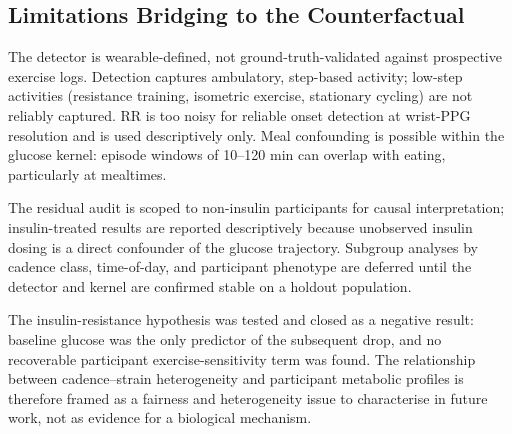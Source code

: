 \subsection{Limitations Bridging to the Counterfactual}
\label{subsec:ex_limitations}

The detector is wearable-defined, not ground-truth-validated against
prospective exercise logs.
Detection captures ambulatory, step-based activity; low-step activities
(resistance training, isometric exercise, stationary cycling) are not reliably
captured.
RR is too noisy for reliable onset detection at wrist-PPG resolution and is
used descriptively only.
Meal confounding is possible within the glucose kernel: episode windows
of 10--120 min can overlap with eating, particularly at mealtimes.

The residual audit is scoped to non-insulin participants for causal
interpretation; insulin-treated results are reported descriptively
because unobserved insulin dosing is a direct confounder of the glucose
trajectory.
Subgroup analyses by cadence class, time-of-day, and participant phenotype
are deferred until the detector and kernel are confirmed stable on a
holdout population.

The insulin-resistance hypothesis was tested and closed as a negative result:
baseline glucose was the only predictor of the subsequent drop, and no
recoverable participant exercise-sensitivity term was found.  The relationship
between cadence--strain heterogeneity and participant metabolic profiles is
therefore framed as a fairness and heterogeneity issue to characterise in
future work, not as evidence for a biological mechanism.


